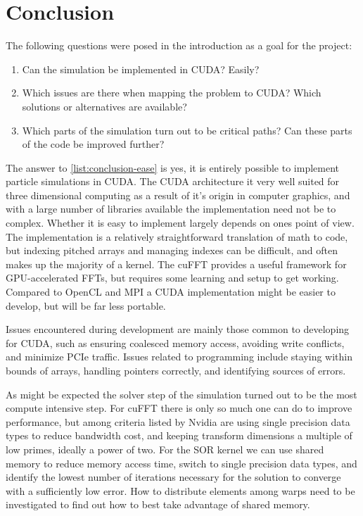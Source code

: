 \chapter{Conclusion}
The following questions were posed in the introduction as a goal for the project:
\begin{enumerate}
	\renewcommand{\theenumi}{\alph{enumi}}
	\item Can the simulation be implemented in CUDA? Easily? \label{list:conclusion-ease}
	\item Which issues are there when mapping the problem to CUDA? Which solutions or alternatives are available? \label{list:conclusion-issues}
	\item Which parts of the simulation turn out to be critical paths? Can these parts of the code be improved further? \label{list:conclusion-bottleneck}
\end{enumerate}
The answer to \ref{list:conclusion-ease} is yes, it is entirely possible to implement particle simulations in CUDA. The
CUDA architecture it very well suited for three dimensional computing as a result of it's origin in computer graphics,
and with a large number of libraries available the implementation need not be to complex. Whether it is easy to
implement largely depends on ones point of view. The implementation is a relatively straightforward translation of math
to code, but indexing pitched arrays and managing indexes can be difficult, and often makes up the majority of a kernel.
The cuFFT provides a useful framework for GPU-accelerated FFTs, but requires some learning and setup to get working.
Compared to OpenCL and MPI a CUDA implementation might be easier to develop, but will be far less portable.

Issues encountered during development are mainly those common to developing for CUDA, such as ensuring coalesced memory
access, avoiding write conflicts, and minimize PCIe traffic. Issues related to programming include staying within bounds
of arrays, handling pointers correctly, and identifying sources of errors.

As might be expected the solver step of the simulation turned out to be the most compute intensive step. For cuFFT there
is only so much one can do to improve performance, but among criteria listed by Nvidia are using single precision data
types to reduce bandwidth cost, and keeping transform dimensions a multiple of low primes, ideally a power of two. For
the SOR kernel we can use shared memory to reduce memory access time, switch to single precision data types, and
identify the lowest number of iterations necessary for the solution to converge with a sufficiently low error. How to
distribute elements among warps need to be investigated to find out how to best take advantage of shared memory.

